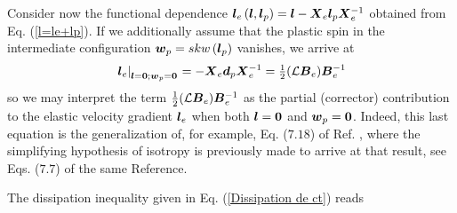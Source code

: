 \documentclass[preprint,review,12pt,sort&compress]{elsarticle}%
\newcommand{\lowpo}[0]{\scriptsize\mathbf{l} = \mathbf{0}; \mathbf{w}_p = \mathbf{0}\normalsize\mathbf{}}
\renewcommand{\mathbf}[1]{\mbox{\boldmath $#1$ \unboldmath}  \!\!}
\begin{document}
Consider now the functional dependence $\mathbf{l}_{e}\left(  \mathbf{l}%
,\mathbf{l}_{p}\right)  =\mathbf{l}-\mathbf{X}_{e}\mathbf{l}_{p}\mathbf{X}%
_{e}^{-1}$ obtained from Eq. (\ref{l=le+lp}). If we additionally assume that
the plastic spin in the intermediate configuration $\mathbf{w}_{p}=skw\left(
\mathbf{l}_{p}\right)  $ vanishes, we arrive at%
\begin{equation}
\left.  \mathbf{l}_{e}\right\vert _{%
\lowpo
}=-\mathbf{X}_{e}\mathbf{d}_{p}\mathbf{X}_{e}^{-1}=\tfrac{1}{2}(\mathcal{L}%
\mathbf{B}_{e})\mathbf{B}_{e}^{-1}%
\end{equation}
so we may interpret the term $\tfrac{1}{2}(\mathcal{L}\mathbf{B}%
_{e})\mathbf{B}_{e}^{-1}$ as the partial (corrector) contribution to the
elastic velocity gradient $\mathbf{l}_{e}$ when both $\mathbf{l}=\mathbf{0}$
and $\mathbf{w}_{p}=\mathbf{0}$. Indeed, this last equation is the
generalization of, for example, Eq. ($7.18$) of Ref. \cite{BonetWoodBook},
where the simplifying hypothesis of isotropy is previously made to arrive at
that result, see Eqs. ($7.7$) of the same Reference.

The dissipation inequality given in Eq. (\ref{Dissipation de ct}) reads%
\end{document}
